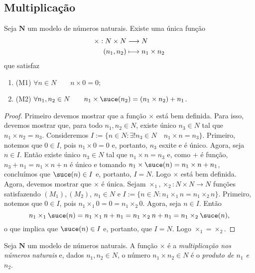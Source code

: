 \subsection{Multiplicação}

\begin{teo}
	Seja $\bm N$ um modelo de números naturais. Existe uma única função
	\begin{align*}
	{\times}: {N \times N} &\longrightarrow {N} \\{(n_1,n_2)} &\longmapsto {n_1 \times n_2}
	\end{align*}
que satisfaz
	\begin{enumerate}
	\item (M1) $\forall n \in N \qquad n \times 0 = 0$;
	\item (M2) $\forall n_1,n_2 \in N \qquad n_1 \times \suce(n_2) = (n_1 \times n_2) + n_1$.
	\end{enumerate}
\end{teo}
\begin{proof}
	Primeiro devemos mostrar que a função $\times$ está bem definida. Para isso, devemos mostrar que, para todo $n_1,n_2 \in N$, existe único $n_3 \in N$ tal que $n_1 \times n_2=n_3$. Consideremos $I := \{n \in N : \exists! n_3 \in N \quad n_1 \times n = n_3\}$. Primeiro, notemos que $0 \in I$, pois $n_1 \times 0 = 0$ e, portanto, $n_3$ esxite e é único. Agora, seja $n \in I$. Então existe único $n_3 \in N$ tal que $n_1 \times n = n_3$ e, como $+$ é função, $n_3 + n_1=n_1 \times n + n$ é único e tomando $n_1 \times \suce(n)=n_1 \times n + n_1$, concluímos que $\suce(n) \in I$ e, portanto, $I=N$. Logo $\times$ está bem definida. Agora, devemos mostrar que $\times$ é única. Sejam $\times_1,\times_2: N \times N \to N$ funções satisfazendo $(M_1),(M_2)$, $n_1 \in N$ e $I := \{n \in N : n_1 \times_1 n = n_1 \times_2 n\}$. Primeiro, notemos que $0 \in I$, pois $n_1 \times_1 0 = 0 = n_1 \times_2 0$. Agora, seja $n \in I$. Então
	\begin{equation*}
	n_1 \times_1 \suce(n) = n_1 \times_1 n + n_1 = n_1 \times_2 n + n_1 = n_1 \times_2 \suce(n),
	\end{equation*}
o que implica que $\suce(n) \in I$ e, portanto, que $I=N$. Logo $\times_1=\times_2$.
\end{proof}

\begin{defi}
	Seja $\bm N$ um modelo de números naturais. A função $\times$ é a \emph{multiplicação nos números naturais} e, dados $n_1,n_2 \in N$, o número $n_1 \times n_2 \in N$ é o \emph{produto de $n_1$ e $n_2$}.
\end{defi}

